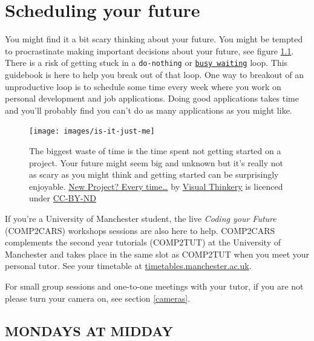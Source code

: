 \documentclass[
]{book}
\begin{document}
\hypertarget{scheduling}{%
\chapter{Scheduling your future}\label{scheduling}}

You might find it a bit scary thinking about your future. You might be tempted to procrastinate making important decisions about your future, see figure \ref{fig:schedule-fig}. There is a risk of getting stuck in a \texttt{do-nothing} or \href{https://en.wikipedia.org/wiki/Busy_waiting}{\texttt{busy\ waiting}} loop. This guidebook is here to help you break out of that loop. One way to breakout of an unproductive loop is to schedule some time every week where you work on personal development and job applications. Doing good applications takes time and you'll probably find you can't do as many applications as you might like.

\begin{figure}

{\centering \texttt{[image: images/is-it-just-me]} 

}

\caption{The biggest waste of time is the time spent not getting started on a project. Your future might seem big and unknown but it's really not as scary as you might think and getting started can be surprisingly enjoyable. \href{https://bryanmmathers.com/new-project-every-time/}{New Project? Every time\ldots{}} by \href{https://visualthinkery.com/}{Visual Thinkery} is licenced under \href{https://creativecommons.org/licenses/by-nd/4.0/}{CC-BY-ND}}\label{fig:schedule-fig}
\end{figure}



If you're a University of Manchester student, the live \emph{Coding your Future} (COMP2CARS) workshops sessions are also here to help.
COMP2CARS complements the second year tutorials (COMP2TUT) at the University of Manchester and takes place in the same slot as COMP2TUT when you meet your personal tutor. See your timetable at \href{https://timetables.manchester.ac.uk/}{timetables.manchester.ac.uk}.

For small group sessions and one-to-one meetings with your tutor, if you are not please turn your camera on, see section \ref{cameras}.

\hypertarget{mondays}{%
\section{MONDAYS AT MIDDAY}\label{mondays}}
\end{document}
